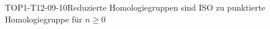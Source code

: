 
\begin{PROP}{TOP1-T12-09-10}{Reduzierte Homologiegruppen sind ISO zu punktierte Homologiegruppe für $n\geq 0$}
\end{PROP}
